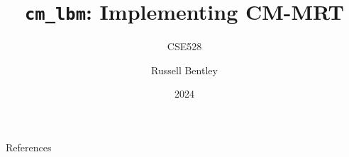\documentclass{beamer}
\title{\lstinline{cm_lbm}: Implementing CM-MRT}
\subtitle{CSE528}
\author{Russell Bentley}
\institute{Stony Brook}
\date{2024}
\begin{document}
\frame{\titlepage}













\begin{frame}[allowframebreaks]{References}
    \tiny
    \printbibliography
\end{frame}
\end{document}
